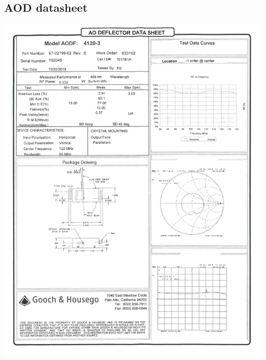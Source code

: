 \documentclass[english, a4paper, 12pt, twoside]{book}
\numberwithin{equation}{section} %
\begin{document}




\newpage




\newpage
\renewcommand{\appendixpagename}{Appendix} %
\renewcommand{\appendixtocname}{Appendix} %
\addappheadtotoc

\begin{appendices}
\chapter{AOD datasheet}
\label{sec:aoddata}
\thispagestyle{empty}
\includegraphics[scale=0.75]{AOD1}


\end{appendices}
\end{document}
